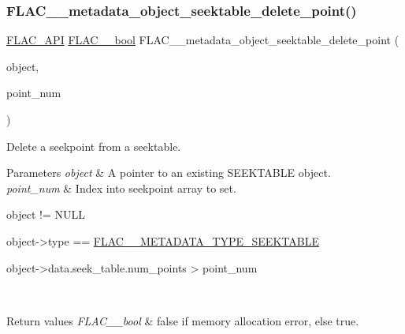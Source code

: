 \subsubsection{\texorpdfstring{F\+L\+A\+C\+\_\+\+\_\+metadata\+\_\+object\+\_\+seektable\+\_\+delete\+\_\+point()}{FLAC\_\_metadata\_object\_seektable\_delete\_point()}}
{\footnotesize\ttfamily \hyperlink{group__flac__export_ga56ca07df8a23310707732b1c0007d6f5}{F\+L\+A\+C\+\_\+\+A\+PI} \hyperlink{ordinals_8h_a95103469f1cbd78b8cf250194985b34e}{F\+L\+A\+C\+\_\+\+\_\+bool} F\+L\+A\+C\+\_\+\+\_\+metadata\+\_\+object\+\_\+seektable\+\_\+delete\+\_\+point (\begin{DoxyParamCaption}\item[{\hyperlink{struct_f_l_a_c_____stream_metadata}{F\+L\+A\+C\+\_\+\+\_\+\+Stream\+Metadata} $\ast$}]{object,  }\item[{unsigned}]{point\+\_\+num }\end{DoxyParamCaption})}

Delete a seekpoint from a seektable.


\begin{DoxyParams}{Parameters}
{\em object} & A pointer to an existing S\+E\+E\+K\+T\+A\+B\+LE object. \\
\hline
{\em point\+\_\+num} & Index into seekpoint array to set.  
\begin{DoxyCode}
\textcolor{keywordtype}{object} != NULL 
\end{DoxyCode}
 
\begin{DoxyCode}
\textcolor{keywordtype}{object}->type == \hyperlink{group__flac__format_ggac71714ba8ddbbd66d26bb78a427fac01a5f6323e489be1318f0e3747960ebdd91}{FLAC\_\_METADATA\_TYPE\_SEEKTABLE} 
\end{DoxyCode}
 
\begin{DoxyCode}
\textcolor{keywordtype}{object}->data.seek\_table.num\_points > point\_num 
\end{DoxyCode}
 \\
\hline
\end{DoxyParams}

\begin{DoxyRetVals}{Return values}
{\em F\+L\+A\+C\+\_\+\+\_\+bool} & {\ttfamily false} if memory allocation error, else {\ttfamily true}. \\
\hline
\end{DoxyRetVals}
\mbox{\label{group__flac__metadata__object_ga0c658260aaffb126486f5d1e211b53e5}} 
